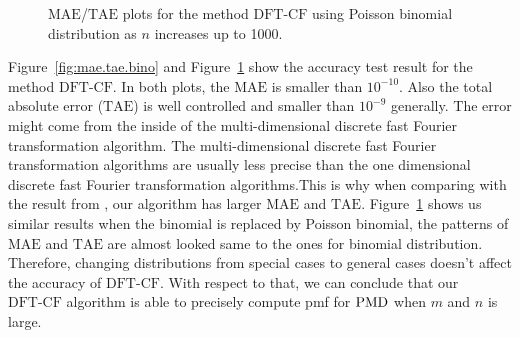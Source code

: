 \documentclass[12pt]{article}
\newcommand{\TAE}{{\textrm{TAE}}}
\newcommand{\MAE}{{\textrm{MAE}}}
\newcommand{\PMD}{{\normalfont\textrm{PMD}}}
\newcommand{\dft}{{\textrm{DFT-CF}}}
\begin{document}
\begin{figure}
\begin{minipage}{0.45\textwidth}
    \end{minipage}
    \caption{$\MAE$/$\TAE$ plots for the method $\dft$ using Poisson binomial distribution as $n$ increases up to 1000.}
    \label{fig:mae.tae.poi}
\end{figure}

Figure~\ref{fig:mae.tae.bino} and Figure~\ref{fig:mae.tae.poi} show the accuracy test result for the method $\dft$. In both plots, the $\MAE$ is smaller than $10^{-10}$. Also the total absolute error ($\TAE$) is well controlled and smaller than $10^{-9}$ generally. The error might come from the inside of the multi-dimensional discrete fast Fourier transformation algorithm. The multi-dimensional discrete fast Fourier transformation algorithms are usually less precise than the one dimensional discrete fast Fourier transformation algorithms.This is why when comparing with the result from , our algorithm has larger $\MAE$ and $\TAE$. Figure~\ref{fig:mae.tae.poi} shows us similar results when the binomial is replaced by Poisson binomial, the patterns of $\MAE$ and $\TAE$ are almost looked same to the ones for binomial distribution. Therefore, changing distributions from special cases to general cases doesn't affect the accuracy of $\dft$. With respect to that, we can conclude that our $\dft$ algorithm is able to precisely compute pmf for $\PMD$ when $m$ and $n$ is large.
\end{document}
